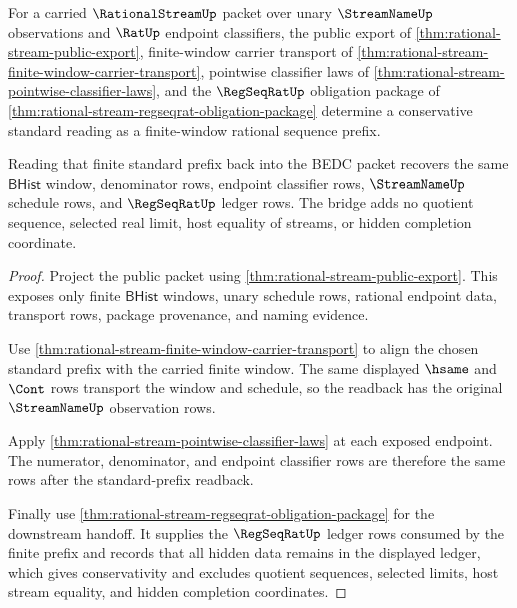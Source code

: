 \begin{theorem}\label{thm:rational-stream-standard-bridge}
For a carried $\RationalStreamUp$ packet over unary $\StreamNameUp$
observations and $\RatUp$ endpoint classifiers, the public export of
\autoref{thm:rational-stream-public-export}, finite-window carrier transport of
\autoref{thm:rational-stream-finite-window-carrier-transport}, pointwise
classifier laws of
\autoref{thm:rational-stream-pointwise-classifier-laws}, and the
$\RegSeqRatUp$ obligation package of
\autoref{thm:rational-stream-regseqrat-obligation-package} determine a
conservative standard reading as a finite-window rational sequence prefix.

Reading that finite standard prefix back into the BEDC packet recovers the
same $\mathsf{BHist}$ window, denominator rows, endpoint classifier rows,
$\StreamNameUp$ schedule rows, and $\RegSeqRatUp$ ledger rows. The bridge adds
no quotient sequence, selected real limit, host equality of streams, or hidden
completion coordinate.
\end{theorem}
\begin{proof}
Project the public packet using
\autoref{thm:rational-stream-public-export}. This exposes only finite
$\mathsf{BHist}$ windows, unary schedule rows, rational endpoint data,
transport rows, package provenance, and naming evidence.

Use \autoref{thm:rational-stream-finite-window-carrier-transport} to align the
chosen standard prefix with the carried finite window. The same displayed
$\hsame$ and $\Cont$ rows transport the window and schedule, so the readback
has the original $\StreamNameUp$ observation rows.

Apply \autoref{thm:rational-stream-pointwise-classifier-laws} at each exposed
endpoint. The numerator, denominator, and endpoint classifier rows are
therefore the same rows after the standard-prefix readback.

Finally use \autoref{thm:rational-stream-regseqrat-obligation-package} for the
downstream handoff. It supplies the $\RegSeqRatUp$ ledger rows consumed by the
finite prefix and records that all hidden data remains in the displayed
ledger, which gives conservativity and excludes quotient sequences, selected
limits, host stream equality, and hidden completion coordinates.
\end{proof}

